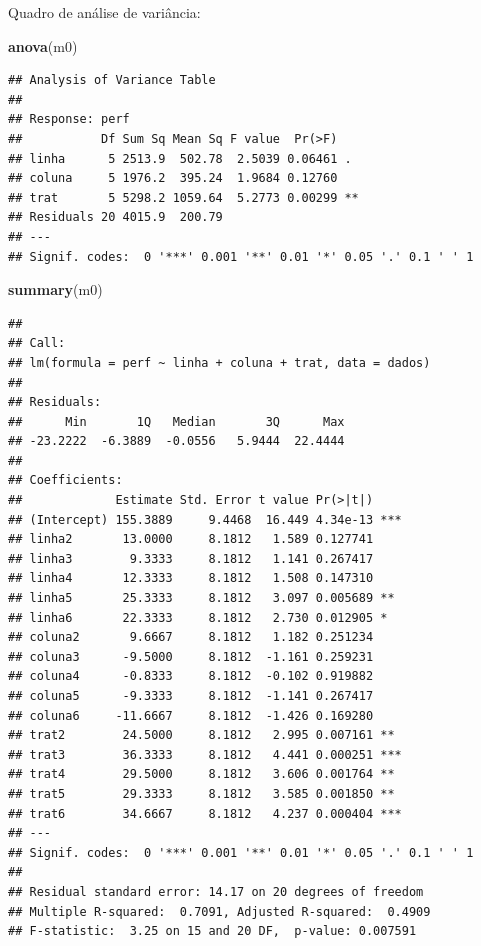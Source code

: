 \documentclass[
]{book}
\newenvironment{Shaded}{\begin{snugshade}}{\end{snugshade}}
\newcommand{\KeywordTok}[1]{\textcolor[rgb]{0.13,0.29,0.53}{\textbf{#1}}}
\newcommand{\NormalTok}[1]{#1}
\begin{document}
Quadro de análise de variância:

\begin{Shaded}
\begin{Highlighting}[]
\KeywordTok{anova}\NormalTok{(m0)}
\end{Highlighting}
\end{Shaded}

\begin{verbatim}
## Analysis of Variance Table
## 
## Response: perf
##           Df Sum Sq Mean Sq F value  Pr(>F)   
## linha      5 2513.9  502.78  2.5039 0.06461 . 
## coluna     5 1976.2  395.24  1.9684 0.12760   
## trat       5 5298.2 1059.64  5.2773 0.00299 **
## Residuals 20 4015.9  200.79                   
## ---
## Signif. codes:  0 '***' 0.001 '**' 0.01 '*' 0.05 '.' 0.1 ' ' 1
\end{verbatim}

\begin{Shaded}
\begin{Highlighting}[]
\KeywordTok{summary}\NormalTok{(m0)}
\end{Highlighting}
\end{Shaded}

\begin{verbatim}
## 
## Call:
## lm(formula = perf ~ linha + coluna + trat, data = dados)
## 
## Residuals:
##      Min       1Q   Median       3Q      Max 
## -23.2222  -6.3889  -0.0556   5.9444  22.4444 
## 
## Coefficients:
##             Estimate Std. Error t value Pr(>|t|)    
## (Intercept) 155.3889     9.4468  16.449 4.34e-13 ***
## linha2       13.0000     8.1812   1.589 0.127741    
## linha3        9.3333     8.1812   1.141 0.267417    
## linha4       12.3333     8.1812   1.508 0.147310    
## linha5       25.3333     8.1812   3.097 0.005689 ** 
## linha6       22.3333     8.1812   2.730 0.012905 *  
## coluna2       9.6667     8.1812   1.182 0.251234    
## coluna3      -9.5000     8.1812  -1.161 0.259231    
## coluna4      -0.8333     8.1812  -0.102 0.919882    
## coluna5      -9.3333     8.1812  -1.141 0.267417    
## coluna6     -11.6667     8.1812  -1.426 0.169280    
## trat2        24.5000     8.1812   2.995 0.007161 ** 
## trat3        36.3333     8.1812   4.441 0.000251 ***
## trat4        29.5000     8.1812   3.606 0.001764 ** 
## trat5        29.3333     8.1812   3.585 0.001850 ** 
## trat6        34.6667     8.1812   4.237 0.000404 ***
## ---
## Signif. codes:  0 '***' 0.001 '**' 0.01 '*' 0.05 '.' 0.1 ' ' 1
## 
## Residual standard error: 14.17 on 20 degrees of freedom
## Multiple R-squared:  0.7091, Adjusted R-squared:  0.4909 
## F-statistic:  3.25 on 15 and 20 DF,  p-value: 0.007591
\end{verbatim}
\end{document}
